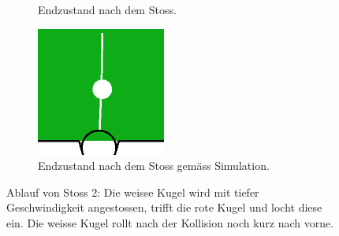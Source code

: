 \begin{figure}[h!]
\begin{subfigure}[t]{0.2\textwidth}
        \caption{Endzustand nach dem Stoss.}
        \label{fig:simulation_vs_reality_1_0028_0032_end}
    \end{subfigure}
    \hfill
    \begin{subfigure}[t]{0.2\textwidth}
        \centering
        \includegraphics[width=1.0\linewidth]{../common/04_results/resources/simulation_vs_reality/simulation_vs_reality_1_0028_0032_simulation_cut.png}
        \caption{Endzustand nach dem Stoss gemäss Simulation.}
        \label{fig:simulation_vs_reality_1_0028_0032_simulation}
    \end{subfigure}
    \caption{
        Ablauf von Stoss 2: Die weisse Kugel wird mit tiefer Geschwindigkeit angestossen, trifft die rote Kugel und locht diese ein.
        Die weisse Kugel rollt nach der Kollision noch kurz nach vorne.
    }
    \label{fig:simulation_vs_reality_1_0028_0032}
\end{figure}

